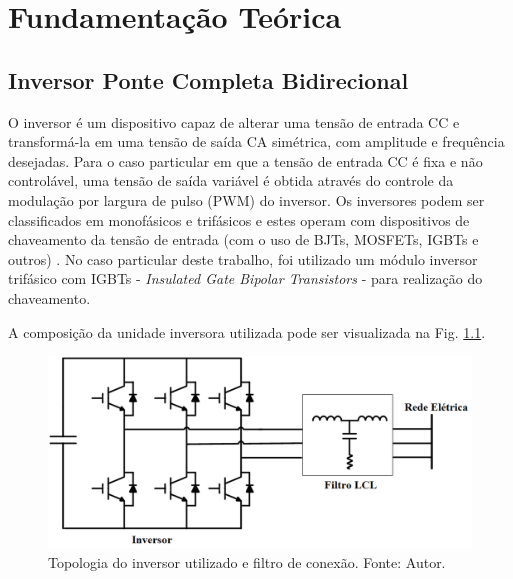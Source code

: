 \chapter{Fundamentação Teórica}

\section{Inversor Ponte Completa Bidirecional}

O inversor é um dispositivo capaz de alterar uma tensão de entrada CC e transformá-la em uma tensão de saída CA simétrica, com amplitude e frequência desejadas. Para o caso particular em que a tensão de entrada CC é fixa e não controlável, uma tensão de saída variável é obtida através do controle da modulação por largura de pulso (PWM) do inversor. Os inversores podem ser classificados em monofásicos e trifásicos e estes operam com dispositivos de chaveamento da tensão de entrada (com o uso de BJTs, MOSFETs, IGBTs e outros) \cite{MRashid}. No caso particular deste trabalho, foi utilizado um módulo inversor trifásico com IGBTs - \textit{Insulated Gate Bipolar Transistors} - para realização do chaveamento. 

A composição da unidade inversora utilizada pode ser visualizada na Fig. \ref{fig:Inversor}.

\begin{figure}[!hbt]
	\begin{center}
		\includegraphics[scale=0.5]{figuras/Inversor.png}
		\caption{Topologia do inversor utilizado e filtro de conexão. Fonte: Autor.}
		\label{fig:Inversor}
	\end{center}
\end{figure}


